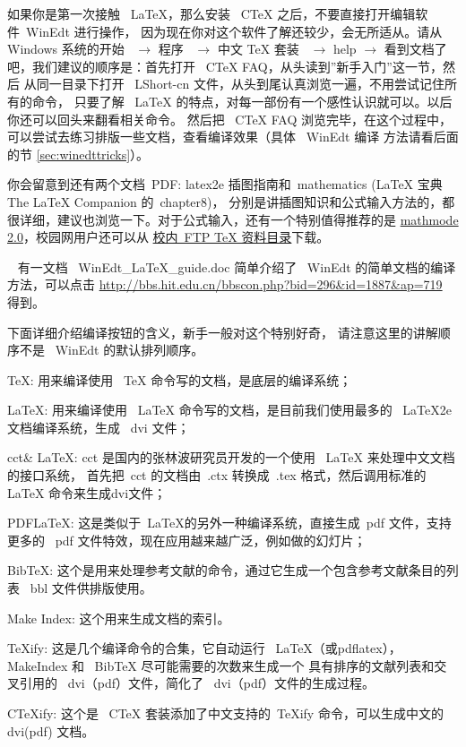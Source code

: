 
如果你是第一次接触~ LaTeX，那么安装~ CTeX 之后，不要直接打开编辑软件~WinEdt 进行操作，
因为现在你对这个软件了解还较少，会无所适从。请从~ Windows
系统的开始~ $\rightarrow$ 程序~ $\rightarrow$ 中文 TeX 套装~ $\rightarrow$ help $\rightarrow$
看到文档了吧，我们建议的顺序是：首先打开~ CTeX FAQ，从头读到''新手入门''这一节，然后
从同一目录下打开~ LShort-cn 文件，从头到尾认真浏览一遍，不用尝试记住所有的命令，
只要了解~ LaTeX 的特点，对每一部份有一个感性认识就可以。以后你还可以回头来翻看相关命令。
然后把 ~CTeX FAQ 浏览完毕，在这个过程中，可以尝试去练习排版一些文档，查看编译效果（具体~ WinEdt 编译
方法请看后面的节 \ref{sec:winedttricks}）。

你会留意到还有两个文档~PDF: latex2e 插图指南和~mathematics (LaTeX 宝典 The LaTeX Companion 的~chapter8)，
分别是讲插图知识和公式输入方法的，都很详细，建议也浏览一下。对于公式输入，还有一个特别值得推荐的是
\href{http://www.tug.org/tex-archive/info/math/voss/mathmode/}{mathmode 2.0}，校园网用户还可以从
\href{ftp://202.118.224.241/software/Science/TeX&LaTeX/}{校内~FTP TeX 资料目录}下载。

\label{sec:winedttricks}
~
有一文档~ WinEdt\_LaTeX\_guide.doc 简单介绍了~ WinEdt 的简单文档的编译方法，可以点击
\url{http://bbs.hit.edu.cn/bbscon.php?bid=296&id=1887&ap=719} 得到。

下面详细介绍编译按钮的含义，新手一般对这个特别好奇，
请注意这里的讲解顺序不是~ WinEdt 的默认排列顺序。
\begin{hitlist}
  \item TeX: 用来编译使用~ TeX 命令写的文档，是底层的编译系统；
  \item LaTeX: 用来编译使用~ LaTeX 命令写的文档，是目前我们使用最多的~ LaTeX2e 文档编译系统，生成~ dvi 文件；
  \item cct\& LaTeX: cct 是国内的张林波研究员开发的一个使用~ LaTeX 来处理中文文档的接口系统，
  首先把~cct 的文档由~.ctx 转换成~.tex 格式，然后调用标准的~ LaTeX 命令来生成dvi文件；
  \item PDFLaTeX: 这是类似于~LaTeX的另外一种编译系统，直接生成~pdf 文件，支持更多的~ pdf 文件特效，现在应用越来越广泛，例如做的幻灯片；
  \item BibTeX: 这个是用来处理参考文献的命令，通过它生成一个包含参考文献条目的列表~ bbl 文件供排版使用。
  \item Make Index: 这个用来生成文档的索引。
  \item TeXify: 这是几个编译命令的合集，它自动运行~ LaTeX（或pdflatex），MakeIndex 和~ BibTeX 尽可能需要的次数来生成一个
  具有排序的文献列表和交叉引用的~ dvi（pdf）文件，简化了~ dvi（pdf）文件的生成过程。
  \item CTeXify: 这个是~ CTeX 套装添加了中文支持的~TeXify 命令，可以生成中文的~ dvi(pdf) 文档。
\end{hitlist}

